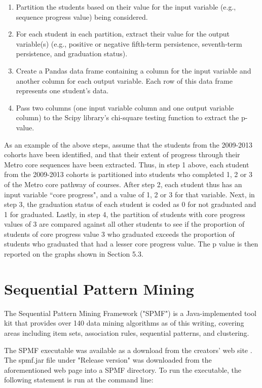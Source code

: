 \begin{enumerate}
    \item Partition the students based on their value for the input variable (e.g., sequence progress value) being considered. 
    \item For each student in each partition, extract their value for the output variable(s) (e.g., positive or negative fifth-term persistence, seventh-term persistence, and graduation status).
    \item Create a Pandas data frame containing a column for the input variable and another column for each output variable.  Each row of this data frame represents one student's data.
    \item Pass two columns (one input variable column and one output variable column) to the Scipy library's chi-square testing function to extract the p-value.
\end{enumerate}

As an example of the above steps, assume that the students from the 2009-2013 cohorts have been identified, and that their extent of progress through their Metro core sequences have been extracted.  Thus, in step 1 above, each student from the 2009-2013 cohorts is partitioned into students who completed 1, 2 or 3 of the Metro core pathway of courses.  After step 2, each student thus has an input variable ``core progress", and a value of 1, 2 or 3 for that variable.  Next, in step 3, the graduation status of each student is coded as 0 for not graduated and 1 for graduated. Lastly, in step 4, the partition of students with core progress values of 3 are compared against all other students to see if the proportion of students of core progress value 3 who graduated exceeds the proportion of students who graduated that had a lesser core progress value.  The p value is then reported on the graphs shown in Section 5.3.  

\section{Sequential Pattern Mining}

The Sequential Pattern Mining Framework ("SPMF") \cite{SPMF_website} is a Java-implemented tool kit that provides over 140 data mining algorithms as of this writing, covering areas including item sets, association rules, sequential patterns, and clustering.  

The SPMF executable was available as a download from the creators' web site \cite{SPMF_website}.  The spmf.jar file under "Release version" was downloaded from the aforementioned web page into a SPMF directory.  To run the executable, the following statement is run at the command line:

